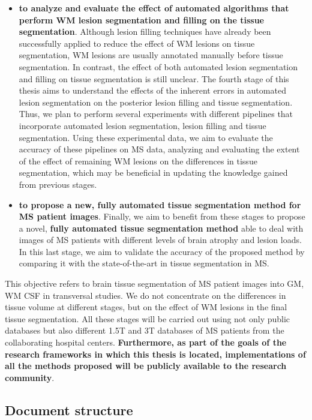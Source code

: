 \begin{itemize}
\item \textbf{to analyze and evaluate the effect of automated algorithms that perform WM lesion segmentation and filling on the tissue segmentation}. Although lesion filling techniques have already been successfully applied to reduce the effect of WM lesions on tissue segmentation, WM lesions are usually annotated manually before tissue segmentation. In contrast, the effect of both automated lesion segmentation and filling on tissue segmentation is still unclear. The fourth stage of this thesis aims to understand the effects of the inherent errors in automated lesion segmentation on the posterior lesion filling and tissue segmentation. Thus, we plan to perform several experiments with different pipelines that incorporate automated lesion segmentation, lesion filling and tissue segmentation. Using these experimental data, we aim to evaluate the accuracy of these pipelines on MS data, analyzing and evaluating the extent of the effect of remaining WM lesions on the differences in tissue segmentation, which may be beneficial in updating the knowledge gained from previous stages. 

\item \textbf{to propose a new, fully automated tissue segmentation method for MS patient images}. Finally, we aim to benefit from these stages to propose a novel, \textbf{fully automated tissue segmentation method} able to deal with images of MS patients with different levels of brain atrophy and lesion loads. In this last stage, we aim to validate the accuracy of the proposed method by comparing it with the state-of-the-art in tissue segmentation in MS. 

\end{itemize}

\noindent This objective refers to brain tissue segmentation of MS patient images into GM, WM CSF in transversal studies. We do not concentrate on the differences in tissue volume at different stages, but on the effect of WM lesions in the final tissue segmentation. All these stages will be carried out using not only public databases but also different 1.5T and 3T databases of MS patients from the collaborating hospital centers. \textbf{Furthermore, as part of the goals of the research frameworks in which this thesis is located, implementations of all the methods proposed will be publicly available to the research community}.

\subsection{Document structure}
\label{sec:label}


